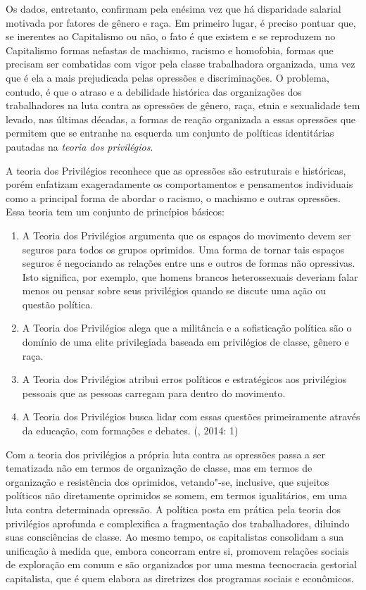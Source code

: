 Os dados, entretanto, confirmam pela enésima vez que há disparidade
salarial motivada por fatores de gênero e raça. Em primeiro lugar, é
preciso pontuar que, se inerentes ao Capitalismo ou não, o fato é que
existem e se reproduzem no Capitalismo formas nefastas de machismo,
racismo e homofobia, formas que precisam ser combatidas com vigor pela
classe trabalhadora organizada, uma vez que é ela a mais prejudicada
pelas opressões e discriminações. O problema, contudo, é que o atraso e
a debilidade histórica das organizações dos trabalhadores na luta contra
as opressões de gênero, raça, etnia e sexualidade tem levado, nas
últimas décadas, a formas de reação organizada a essas opressões que
permitem que se entranhe na esquerda um conjunto de políticas
identitárias pautadas na \emph{teoria dos privilégios}.

A teoria dos Privilégios reconhece que as opressões são estruturais e
históricas, porém enfatizam exageradamente os comportamentos e
pensamentos individuais como a principal forma de abordar o racismo, o
machismo e outras opressões. Essa teoria tem um conjunto de princípios
básicos:

\begin{enumerate}
\def\labelenumi{\alph{enumi}.}

\item A Teoria dos Privilégios argumenta que os espaços do
movimento devem ser seguros para todos os grupos oprimidos. Uma forma de
tornar tais espaços seguros é negociando as relações entre uns e outros
de formas não opressivas. Isto significa, por exemplo, que homens
brancos heterossexuais deveriam falar menos ou pensar sobre seus
privilégios quando se discute uma ação ou questão política.

\item A Teoria dos Privilégios alega que a militância e a
sofisticação política são o domínio de uma elite privilegiada baseada em
privilégios de classe, gênero e raça.

\item A Teoria dos Privilégios atribui erros políticos e
estratégicos aos privilégios pessoais que as pessoas carregam para
dentro do movimento.

\item A Teoria dos Privilégios busca lidar com essas questões
primeiramente através da educação, com formações e debates. (, 2014:
1)
\end{enumerate}

Com a teoria dos privilégios a própria luta contra as opressões passa a
ser tematizada não em termos de organização de classe, mas em termos de
organização e resistência dos oprimidos, vetando"-se, inclusive, que
sujeitos políticos não diretamente oprimidos se somem, em termos
igualitários, em uma luta contra determinada opressão. A política posta
em prática pela teoria dos privilégios aprofunda e complexifica a
fragmentação dos trabalhadores, diluindo suas consciências de classe. Ao
mesmo tempo, os capitalistas consolidam a sua unificação à medida que,
embora concorram entre si, promovem relações sociais de exploração em
comum e são organizados por uma mesma tecnocracia gestorial capitalista,
que é quem elabora as diretrizes dos programas sociais e econômicos.

